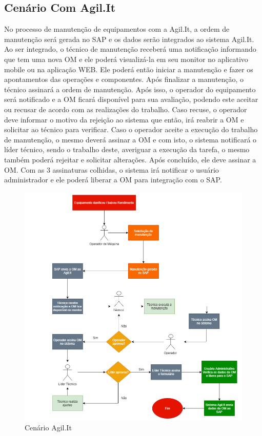 \subsection{Cenário Com Agil.It}
No processo de manutenção de equipamentos com a Agil.It, a ordem de manutenção será gerada no SAP e os dados serão integrados ao sistema Agil.It. Ao ser integrado, o técnico de manutenção receberá uma notificação informando que tem uma nova OM e ele poderá visualizá-la em seu monitor no aplicativo mobile ou na aplicação WEB. Ele poderá então iniciar a manutenção e fazer os apontamentos das operações e componentes. Após finalizar a manutenção, o técnico assinará a ordem de manutenção. Após isso, o operador do equipamento será notificado e a OM ficará disponível para sua avaliação, podendo este aceitar ou recusar de acordo com as realizações do trabalho. Caso recuse, o operador deve informar o motivo da rejeição ao sistema que então, irá reabrir a OM e solicitar ao técnico para verificar. Caso o operador aceite a execução do trabalho de manutenção, o mesmo deverá assinar a OM e com isto, o sistema notificará o líder técnico, sendo o trabalho deste, averiguar a execução da tarefa, o mesmo também poderá rejeitar e solicitar alterações. Após concluído, ele deve assinar a OM. Com as 3 assinaturas colhidas, o sistema irá notificar o usuário administrador e ele poderá liberar a OM para integração com o SAP.

\begin{figure}[H]
	\caption{\label{figure:cenario_agilit1}Cenário Agil.It}
	\begin{center}
		\includegraphics[scale=0.70]{./Figuras/cenario-agilit1.png}
	\end{center}
\end{figure}
